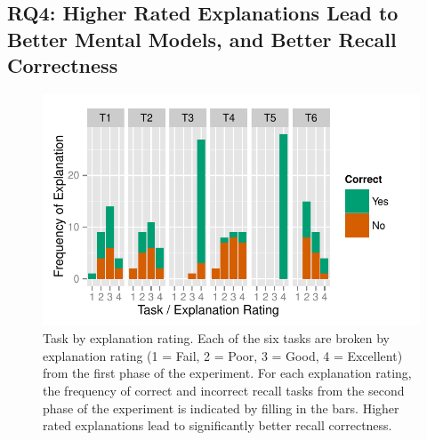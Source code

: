 \documentclass[conference]{IEEEtran}
\begin{document}





\subsection{RQ4: Higher Rated Explanations Lead to Better Mental Models, and Better Recall Correctness}

\begin{figure}[!t]
\centering
\includegraphics[width=\columnwidth]{explanation_by_task}
\caption{Task by explanation rating. Each of the six tasks are broken by explanation rating (1 = Fail, 2 = Poor, 3 = Good, 4 = Excellent) from the first phase of the experiment. For each explanation rating, the frequency of correct and incorrect recall tasks from the second phase of the experiment is indicated by filling in the bars. Higher rated explanations lead to significantly better recall correctness.}\label{fig:explanationbytask}
\end{figure}
\end{document}
